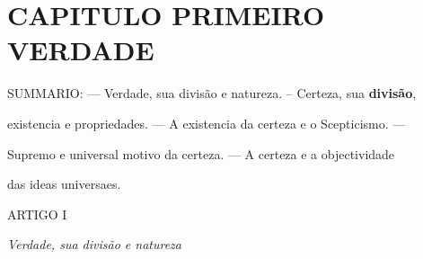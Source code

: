 
\chapter*{CAPITULO PRIMEIRO\\[0.3em]\large VERDADE}

 SUMMARIO: --- Verdade, sua divisão e natureza. -- Certeza, sua \textbf{divisão},

existencia e propriedades. --- A existencia da certeza e o Scepticismo. ---

Supremo e universal motivo da certeza. --- A certeza e a objectividade

das ideas universaes.

ARTIGO I

\emph{Verdade, sua divisão e natureza}


